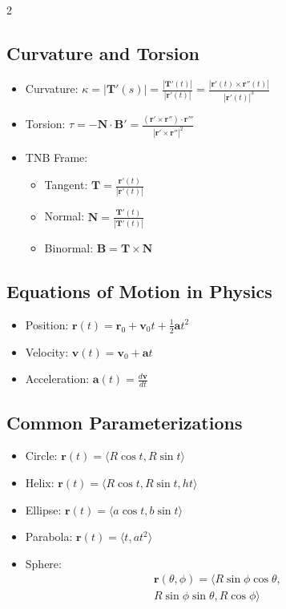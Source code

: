\begin{multicols}{2}
\subsection*{Curvature and Torsion}
\begin{itemize}
\item Curvature: $\kappa = |\mathbf{T}'(s)| = \frac{|\mathbf{T}'(t)|}{|\mathbf{r}'(t)|} = \frac{|\mathbf{r}'(t) \times \mathbf{r}''(t)|}{|\mathbf{r}'(t)|^3}$
\item Torsion: $\tau = -\mathbf{N} \cdot \mathbf{B}' = \frac{(\mathbf{r}' \times \mathbf{r}'') \cdot \mathbf{r}'''}{|\mathbf{r}' \times \mathbf{r}''|^2}$
\item TNB Frame:
  \begin{itemize}
  \item Tangent: $\mathbf{T} = \frac{\mathbf{r}'(t)}{|\mathbf{r}'(t)|}$
  \item Normal: $\mathbf{N} = \frac{\mathbf{T}'(t)}{|\mathbf{T}'(t)|}$
  \item Binormal: $\mathbf{B} = \mathbf{T} \times \mathbf{N}$
  \end{itemize}
\end{itemize}

\subsection*{Equations of Motion in Physics}
\begin{itemize}
\item Position: $\mathbf{r}(t) = \mathbf{r}_0 + \mathbf{v}_0t + \frac{1}{2}\mathbf{a}t^2$
\item Velocity: $\mathbf{v}(t) = \mathbf{v}_0 + \mathbf{a}t$
\item Acceleration: $\mathbf{a}(t) = \frac{d\mathbf{v}}{dt}$
\end{itemize}

\subsection*{Common Parameterizations}
\begin{itemize}
\item Circle: $\mathbf{r}(t) = \langle R\cos t, R\sin t \rangle$
\item Helix: $\mathbf{r}(t) = \langle R\cos t, R\sin t, ht \rangle$
\item Ellipse: $\mathbf{r}(t) = \langle a\cos t, b\sin t \rangle$
\item Parabola: $\mathbf{r}(t) = \langle t, at^2 \rangle$
\item Sphere: 
    \begin{multline*}
\mathbf{r}(\theta, \phi) = \langle R\sin\phi\cos\theta, \\
R\sin\phi\sin\theta, R\cos\phi \rangle
    \end{multline*}
\end{itemize}


\end{multicols}
